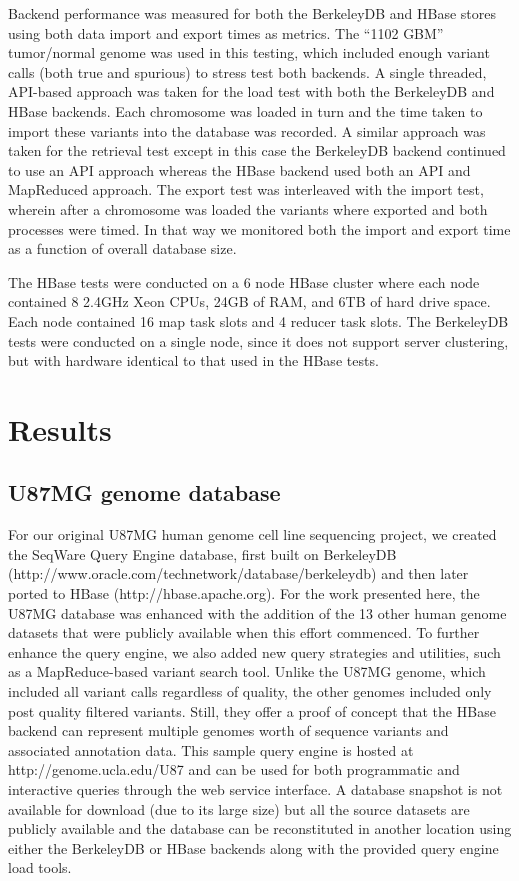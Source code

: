 \documentclass[10pt]{bmc_article}
\newenvironment{bmcformat}{\begin{raggedright}\baselineskip20pt\sloppy\setboolean{publ}{false}}{\end{raggedright}\baselineskip20pt\sloppy}
\begin{document}
\begin{bmcformat}
Backend performance was measured for both the BerkeleyDB and HBase stores using both data import and export times as metrics. The “1102 GBM” tumor/normal genome was used in this testing, which included enough variant calls (both true and spurious) to stress test both backends. A single threaded, API-based approach was taken for the load test with both the BerkeleyDB and HBase backends. Each chromosome was loaded in turn and the time taken to import these variants into the database was recorded. A similar approach was taken for the retrieval test except in this case the BerkeleyDB backend continued to use an API approach whereas the HBase backend used both an API and MapReduced approach. The export test was interleaved with the import test, wherein after a chromosome was loaded the variants where exported and both processes were timed. In that way we monitored both the import and export time as a function of overall database size.

The HBase tests were conducted on a 6 node HBase cluster where each node contained 8 2.4GHz Xeon CPUs, 24GB of RAM, and 6TB of hard drive space. Each node contained 16 map task slots and 4 reducer task slots. The BerkeleyDB tests were conducted on a single node, since it does not support server clustering, but with hardware identical to that used in the HBase tests.


\section*{Results}

\subsection*{U87MG genome database}

For our original U87MG human genome cell line sequencing project, we created the SeqWare Query Engine database, first built on BerkeleyDB (http://www.oracle.com/technetwork/database/berkeleydb) and then later ported to HBase (http://hbase.apache.org). For the work presented here, the U87MG database was enhanced with the addition of the 13 other human genome datasets that were publicly available when this effort commenced. To further enhance the query engine, we also added new query strategies and utilities, such as a MapReduce-based variant search tool. Unlike the U87MG genome, which included all variant calls regardless of quality, the other genomes included only post quality filtered variants. Still, they offer a proof of concept that the HBase backend can represent multiple genomes worth of sequence variants and associated annotation data. This sample query engine is hosted at http://genome.ucla.edu/U87 and can be used for both programmatic and interactive queries through the web service interface. A database snapshot is not available for download (due to its large size) but all the source datasets are publicly available and the database can be reconstituted in another location using either the BerkeleyDB or HBase backends along with the provided query engine load tools.


\end{bmcformat}
\end{document}
